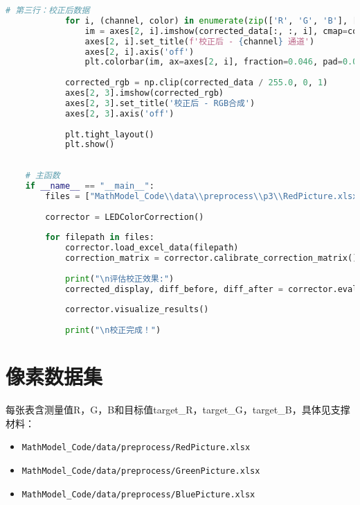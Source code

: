 \begin{lstlisting}[language=Python]
            # 第三行：校正后数据
            for i, (channel, color) in enumerate(zip(['R', 'G', 'B'], ['Reds', 'Greens', 'Blues'])):
                im = axes[2, i].imshow(corrected_data[:, :, i], cmap=color, vmin=0, vmax=255)
                axes[2, i].set_title(f'校正后 - {channel} 通道')
                axes[2, i].axis('off')
                plt.colorbar(im, ax=axes[2, i], fraction=0.046, pad=0.04)
            
            corrected_rgb = np.clip(corrected_data / 255.0, 0, 1)
            axes[2, 3].imshow(corrected_rgb)
            axes[2, 3].set_title('校正后 - RGB合成')
            axes[2, 3].axis('off')
            
            plt.tight_layout()
            plt.show()
    
    
    # 主函数
    if __name__ == "__main__":
        files = ["MathModel_Code\\data\\preprocess\\p3\\RedPicture.xlsx", "MathModel_Code\\data\\preprocess\\p3\\GreenPicture.xlsx", "MathModel_Code\\data\\preprocess\\p3\\BluePicture.xlsx"]
        
        corrector = LEDColorCorrection()
        
        for filepath in files:
            corrector.load_excel_data(filepath)
            correction_matrix = corrector.calibrate_correction_matrix()
            
            print("\n评估校正效果:")
            corrected_display, diff_before, diff_after = corrector.evaluate_correction()
            
            corrector.visualize_results()
            
            print("\n校正完成！")
\end{lstlisting}

\newpage
\section[\hspace{-2pt}像素数据集]{{\heiti{} \hspace{-8pt}像素数据集}}

每张表含测量值R，G，B和目标值target\_R，target\_G，target\_B，具体见支撑材料：
\begin{itemize}
    \item \texttt{MathModel\_Code/data/preprocess/RedPicture.xlsx}
    \item \texttt{MathModel\_Code/data/preprocess/GreenPicture.xlsx}  
    \item \texttt{MathModel\_Code/data/preprocess/BluePicture.xlsx}
\end{itemize}

